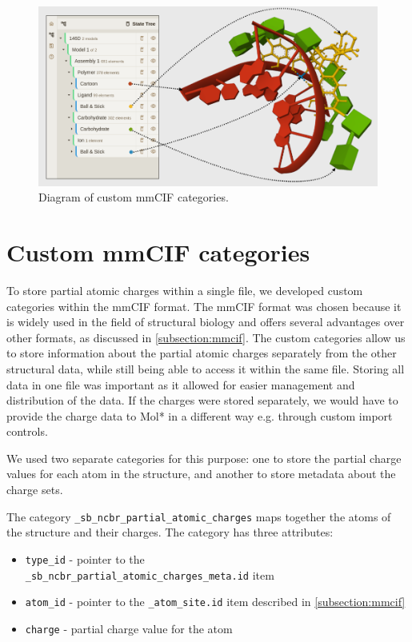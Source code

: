 \documentclass[
  digital,     %
  oneside,     %
  nosansbold,  %
  nocolorbold, %
  lof,         %
  lot,         %
]{fithesis4}
\begin{document}
\begin{figure}
  \begin{center}
    \includegraphics[width=\textwidth]{figures/state_tree.png}
  \end{center}
  \caption{Diagram of custom mmCIF categories.}
  \label{fig:state_tree}
\end{figure}

\section{Custom mmCIF categories}
\label{section:custom_mmcif_categories}

To store partial atomic charges within a single file, we developed custom categories within the mmCIF format. The mmCIF format was chosen because it is widely used in the field of structural biology and offers several advantages over other formats, as discussed in \ref{subsection:mmcif}. The custom categories allow us to store information about the partial atomic charges separately from the other structural data, while still being able to access it within the same file. Storing all data in one file was important as it allowed for easier management and distribution of the data. If the charges were stored separately, we would have to provide the charge data to Mol* in a different way e.g. through custom import controls.


We used two separate categories for this purpose: one to store the partial charge values for each atom in the structure, and another to store metadata about the charge sets.

The category \texttt{\_sb\_ncbr\_partial\_atomic\_charges} maps together the atoms of the structure and their charges. The category has three attributes:

\begin{itemize}
  \item \texttt{type\_id} - pointer to the \\ \texttt{\_sb\_ncbr\_partial\_atomic\_charges\_meta.id} item
  \item \texttt{atom\_id} - pointer to the \texttt{\_atom\_site.id} item described in \ref{subsection:mmcif}
  \item \texttt{charge} - partial charge value for the atom
\end{itemize}
\end{document}
